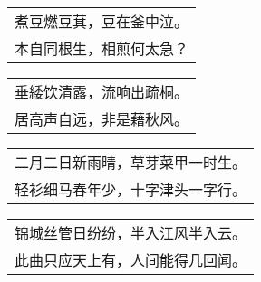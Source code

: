 \noindent\begin{minipage}{\linewidth}
  \vskip-3pt\begin{table}[H]
    \centering
    \begin{tabular}{@{}l@{}}
煮豆燃豆萁，豆在釜中泣。\\
本自同根生，相煎何太急？
    \end{tabular}
  \end{table}
\end{minipage}
\vspace{1cm}


\noindent\begin{minipage}{\linewidth}
  \vskip-3pt\begin{table}[H]
    \centering
    \begin{tabular}{@{}l@{}}
垂緌饮清露，流响出疏桐。\\
居高声自远，非是藉秋风。
    \end{tabular}
  \end{table}
\end{minipage}
\vspace{1cm}


\noindent\begin{minipage}{\linewidth}
  \vskip-3pt\begin{table}[H]
    \centering
    \begin{tabular}{@{}l@{}}
二月二日新雨晴，草芽菜甲一时生。\\
轻衫细马春年少，十字津头一字行。
    \end{tabular}
  \end{table}
\end{minipage}
\vspace{1cm}


\noindent\begin{minipage}{\linewidth}
  \vskip-3pt\begin{table}[H]
    \centering
    \begin{tabular}{@{}l@{}}
锦城丝管日纷纷，半入江风半入云。\\
此曲只应天上有，人间能得几回闻。
    \end{tabular}
  \end{table}
\end{minipage}
\vspace{1cm}


